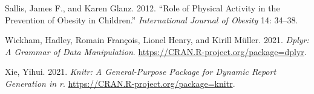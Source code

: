 \documentclass[
  letterpaper,
  DIV=11,
  numbers=noendperiod]{scrartcl}
\newlength{\cslhangindent}
\newlength{\cslentryspacingunit} %
\newenvironment{CSLReferences}[2] %
 {%
  \setlength{\parindent}{0pt}
  \ifodd #1
  \let\oldpar\par
  \def\par{\hangindent=\cslhangindent\oldpar}
  \fi
  \setlength{\parskip}{#2\cslentryspacingunit}
 }%
 {}
\begin{document}
\begin{CSLReferences}{1}{0}
\leavevmode{}%
Sallis, James F., and Karen Glanz. 2012. {``Role of Physical Activity in
the Prevention of Obesity in Children.''} \emph{International Journal of
Obesity} 14: 34--38.

\leavevmode{}%
Wickham, Hadley, Romain François, Lionel Henry, and Kirill Müller. 2021.
\emph{Dplyr: A Grammar of Data Manipulation}.
\url{https://CRAN.R-project.org/package=dplyr}.

\leavevmode{}%
Xie, Yihui. 2021. \emph{Knitr: A General-Purpose Package for Dynamic
Report Generation in r}. \url{https://CRAN.R-project.org/package=knitr}.

\end{CSLReferences}
\end{document}
